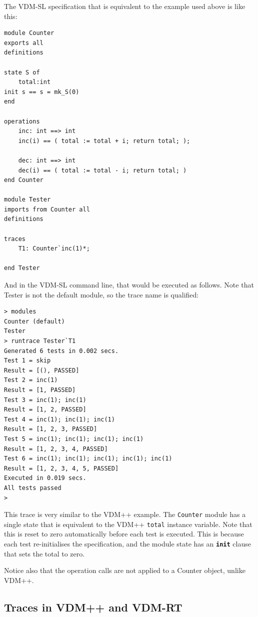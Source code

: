 \documentclass{overturerepchap}
\begin{document}
The VDM-SL specification that is equivalent to the example used above is like
this:

\small
\begin{lstlisting}
module Counter
exports all
definitions

state S of
    total:int
init s == s = mk_S(0)
end

operations
    inc: int ==> int
    inc(i) == ( total := total + i; return total; );

    dec: int ==> int
    dec(i) == ( total := total - i; return total; )
end Counter

module Tester
imports from Counter all
definitions

traces
    T1: Counter`inc(1)*;

end Tester
\end{lstlisting}
\normalsize

\noindent And in the VDM-SL command line, that would be executed as follows. Note that
Tester is not the default module, so the trace name is qualified:

\scriptsize
\lstset{style=tool,language=}
\begin{lstlisting}[escapechar=@]
> modules
Counter (default)
Tester
> runtrace Tester`T1
Generated 6 tests in 0.002 secs. 
Test 1 = skip
Result = [(), PASSED]
Test 2 = inc(1)
Result = [1, PASSED]
Test 3 = inc(1); inc(1)
Result = [1, 2, PASSED]
Test 4 = inc(1); inc(1); inc(1)
Result = [1, 2, 3, PASSED]
Test 5 = inc(1); inc(1); inc(1); inc(1)
Result = [1, 2, 3, 4, PASSED]
Test 6 = inc(1); inc(1); inc(1); inc(1); inc(1)
Result = [1, 2, 3, 4, 5, PASSED]
Executed in 0.019 secs. 
All tests passed
>
\end{lstlisting}
\lstset{style=mystyle}
\lstset{language=VDM++}
\normalsize

\noindent This trace is very similar to the VDM++ example. The \texttt{Counter} module has a
single state that is equivalent to the VDM++ \texttt{total} instance variable.
Note that this is reset to zero automatically before each test is executed. This is
because each test re-initialises the specification, and the module
state has an \texttt{\textbf{init}} clause that sets the total to zero.

Notice also that the operation calls are not applied to a Counter object, unlike
VDM++.

\subsection{Traces in VDM++ and VDM-RT}
\end{document}
